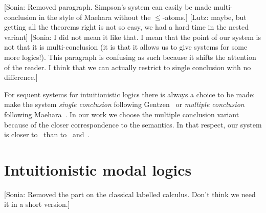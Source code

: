 \documentclass[twoside]{aiml18}
\newcommand{\sonia}[1]{{\color{blue}[Sonia: #1]}}
\newcommand{\lutz}[1]{{\color{green}[Lutz: #1]}}
\begin{document}
\sonia{Removed paragraph. Simpson's system can easily be made multi-conclusion in the style of Maehara without the $\le$-atoms.}
\lutz{maybe, but getting all the theorems right is not so easy, we had a hard time in the nested variant}
\sonia{I did not mean it like that. I mean that the point of our system is not that it is multi-conclusion (it is that it allows us to give systems for some more logics!). This paragraph is confusing as such because it shifts the attention of the reader. I think that we can actually restrict to single conclusion with no difference.}

For sequent systems for intuitionistic logics there is always a choice
to be made: make the system \emph{single conclusion} following
Gentzen~\cite{Gentzen} or \emph{multiple conclusion} following
Maehara~\cite{Maehara}. In our work we choose the multiple conclusion
variant because of the closer correspondence to the semantics. In that
respect, our system is closer to~\cite{kuz:str} than
to~\cite{Simpson} and~\cite{mar:str}.

\section{Intuitionistic modal logics}

\sonia{Removed the part on the classical labelled calculus. Don't think we need it in a short version.}
\end{document}

